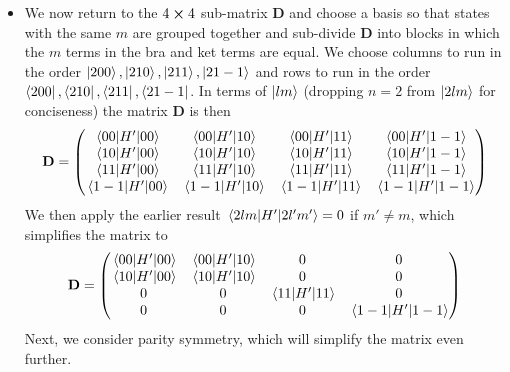 \documentclass[11pt, a4paper]{article}
\newcommand{\mat}[1]{\mathbf{#1}} %
\begin{document}
\begin{itemize}
	
	\item We now return to the $ 4 \cross 4 $ sub-matrix $ \mat{D} $ and choose a basis so that states with the same $ m $ are grouped together and sub-divide $ \mat{D} $ into blocks in which the $ m $ terms in the bra and ket terms are equal. We choose columns to run in the order $ \ket{200}, \ket{210}, \ket{211}, \ket{21-1} $ and rows to run in the order $ \bra{200}, \bra{210}, \bra{211}, \bra{21-1} $. In terms of $ \ket{lm} $ (dropping $ n = 2 $ from $ \ket{2lm} $ for conciseness) the matrix $ \mat{D} $ is then
	\begin{equation*}
		\mat{D} =
		\begin{pmatrix}
			\mel{00}{H'}{00} & \mel{00}{H'}{10} & \mel{00}{H'}{11} & \mel{00}{H'}{1-1}\\
			\mel{10}{H'}{00} & \mel{10}{H'}{10} & \mel{10}{H'}{11} & \mel{10}{H'}{1-1}\\
			\mel{11}{H'}{00} & \mel{11}{H'}{10} & \mel{11}{H'}{11} & \mel{11}{H'}{1-1}\\
			\mel{1-1}{H'}{00} & \mel{1-1}{H'}{10} & \mel{1-1}{H'}{11} & \mel{1-1}{H'}{1-1}
		\end{pmatrix}
	\end{equation*}
	We then apply the earlier result $ \mel{2lm}{H'}{2l'm'} = 0 $ if  $	m' \neq m  $, which simplifies the matrix to
	\begin{equation*}
		\mat{D} =
		\begin{pmatrix}
			\mel{00}{H'}{00} & \mel{00}{H'}{10} & 0 & 0\\
			\mel{10}{H'}{00} & \mel{10}{H'}{10} & 0 & 0\\
			0 & 0 & \mel{11}{H'}{11} & 0 \\
			0 & 0 & 0 & \mel{1-1}{H'}{1-1}
		\end{pmatrix}
	\end{equation*}
	Next, we consider parity symmetry, which will simplify the matrix even further.
\end{itemize}
\end{document}
